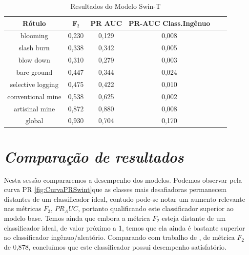 \begin{table}[h!]
        \caption{Resultados do Modelo Swin-T}
        \centering
    \begin{tabular}{*{6}{c}}
        \toprule
                     Rótulo &  F₂    &   PR AUC &  PR-AUC Class.Ingênuo \\
        \midrule
                  blooming &  0,230 &    0,129 &       0,008 \\
                slash burn &  0,338 &    0,342 &       0,005 \\
                 blow down &  0,310 &    0,279 &       0,003 \\
               bare ground &  0,447 &    0,344 &       0,024 \\
         selective logging &  0,475 &    0,422 &       0,010 \\
         conventional mine &  0,538 &    0,625 &       0,002 \\
            artisinal mine &  0,872 &    0,880 &       0,008 \\
                    global &  0,930 &    0,704 &       0,170 \\
        \bottomrule
    \end{tabular}
    \label{table:ResultadosSwinT}
\end{table}
    
    
\section{\textit{Comparação de resultados}}\label{sec:Cap4_Comparação de resultados}    

Nesta sessão compararemos a desempenho dos modelos. Podemos observar pela curva PR \ref{fig:CurvaPRSwint}que as classes mais desafiadoras permanecem distantes de um classificador ideal, contudo pode-se notar um aumento relevante nas métricas $F_2$, $PR_AUC$, portanto qualificando este classificador superior ao modelo base. Temos ainda que embora a métrica $F_2$ esteja distante de um classificador ideal, de valor próximo a 1, temos que ela ainda é bastante superior ao classificador ingênuo/aleatório. Comparando com trabalho de \cite{9701667}, de métrica $F_2$ de 0,878, concluímos que este classificador possui desempenho satisfatório.




